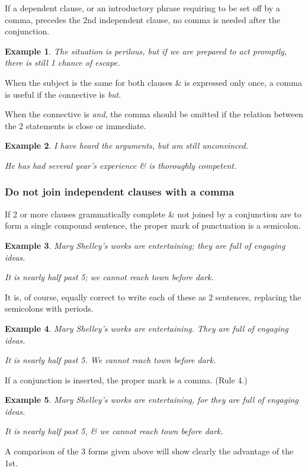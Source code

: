 \documentclass{article}
\newtheorem{example}{Example}
\begin{document}
%
If a dependent clause, or an introductory phrase requiring to be set off by a comma, precedes the 2nd independent clause, no comma is needed after the conjunction.
\begin{example}
	The situation is perilous, but if we are prepared to act promptly, there is still 1 chance of escape.
\end{example}
When the subject is the same for both clauses \& is expressed only once, a comma is useful if the connective is {\it but}.

When the connective is {\it and}, the comma should be omitted if the relation between the 2 statements is close or immediate.
\begin{example}
	I have heard the arguments, but am still unconvinced.
	
	He has had several year's experience \& is thoroughly competent.
\end{example}


\subsubsection{Do not join independent clauses with a comma}
If 2 or more clauses grammatically complete \& not joined by a conjunction are to form a single compound sentence, the proper mark of punctuation is a semicolon.
\begin{example}
	Mary Shelley's works are entertaining; they are full of engaging ideas.
	
	It is nearly half past 5; we cannot reach town before dark.
\end{example}
It is, of course, equally correct to write each of these as 2 sentences, replacing the semicolons with periods.
\begin{example}
	Mary Shelley's works are entertaining. They are full of engaging ideas.
	
	It is nearly half past 5. We cannot reach town before dark.
\end{example}
If a conjunction is inserted, the proper mark is a comma. (Rule 4.)
\begin{example}
	Mary Shelley's works are entertaining, for they are full of engaging ideas.
	
	It is nearly half past 5, \& we cannot reach town before dark.
\end{example}
A comparison of the 3 forms given above will show clearly the advantage of the 1st.
\end{document}
